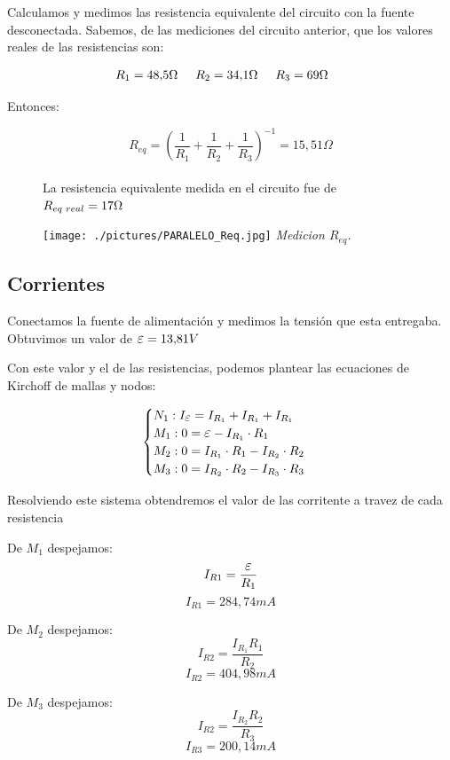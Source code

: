 \documentclass[12pt]{report}
\newcommand {\LEpsilon}{\mathlarger{\mathlarger{\varepsilon}}}
\begin{document}
Calculamos y medimos las resistencia equivalente del circuito con la fuente desconectada.
Sabemos, de las mediciones del circuito anterior, que los valores reales de las resistencias son:

$$R_1 = 48,\!5\Omega \hspace{5mm} R_2 = 34,\!1\Omega \hspace{5mm} R_3 = 69\Omega \hspace{5mm}$$

Entonces:

\noindent
\begin{figure}[h]
  \centering
  \begin{minipage}[h]{0.4\textwidth}
    \centering
    \vspace{-2em}
    $$R_{eq}  = \left( \frac{1}{R_1}+\frac{1}{R_2}+\frac{1}{R_3} \right) ^{-1} = 15,\!51 \Omega$$\\
    La resistencia equivalente medida en el circuito fue de $R_{eq\hspace{1mm}real} = 17 \Omega$
  \end{minipage}\hskip 1cm
  \begin{minipage}[h]{0.4\textwidth}
    \centering
    \texttt{[image: ./pictures/PARALELO\_Req.jpg]}
    \textit{Medicion $R_{eq}$.}
  \end{minipage}
\end{figure}


\subsection{Corrientes}
Conectamos la fuente de alimentación y medimos la tensión que esta entregaba. Obtuvimos un valor de 
$ \LEpsilon=13,\!81 V $

Con este valor y el de las resistencias, podemos plantear las ecuaciones de Kirchoff de mallas y
nodos:

\[
\begin{cases}
  N_1 : I_{\LEpsilon} = I_{R_1} + I_{R_1} + I_{R_1} \\
  M_1 : 0 = \LEpsilon - I_{R_1} \cdot R_1 \\
  M_2 : 0 = I_{R_1} \cdot R_1 - I_{R_2} \cdot R_2 \\
  M_3 : 0 = I_{R_2} \cdot R_2 - I_{R_3} \cdot R_3
\end{cases}
\]

Resolviendo este sistema obtendremos el valor de las corritente a travez de cada resistencia

\noindent
\begin{minipage}[t]{0.33\textwidth}
  \centering
  De $M_1$ despejamos:
  $$I_{R1} = \frac{\LEpsilon}{R_1}$$
  $$I_{R1} = 284,\!74 mA $$
\end{minipage}
\begin{minipage}[t]{0.33\textwidth}
  \centering
  De $M_2$ despejamos:
  $$I_{R2} = \frac{I_{R_1}R_1}{R_2} $$
  $$I_{R2} = 404,\!98 mA $$
\end{minipage}
\begin{minipage}[t]{0.33\textwidth}
  \centering
  De $M_3$ despejamos:
  $$I_{R2} = \frac{I_{R_2}R_2}{R_3} $$
  $$I_{R3} = 200,\!14 mA $$
\end{minipage}
\end{document}
